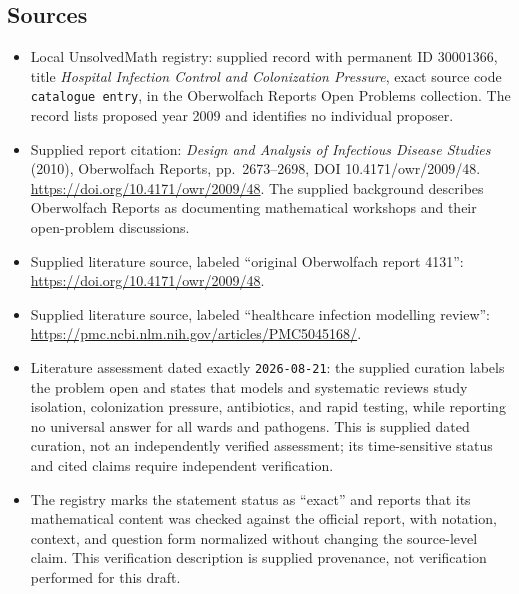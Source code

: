 \documentclass[11pt]{article}
\begin{document}
\subsection{Sources}
\begin{itemize}
\item Local UnsolvedMath registry: supplied record with permanent ID \(30001366\), title \emph{Hospital Infection Control and Colonization Pressure}, exact source code \texttt{catalogue entry}, in the Oberwolfach Reports Open Problems collection. The record lists proposed year 2009 and identifies no individual proposer.
\item Supplied report citation: \emph{Design and Analysis of Infectious Disease Studies} (2010), Oberwolfach Reports, pp.\ 2673--2698, DOI 10.4171/owr/2009/48. \url{https://doi.org/10.4171/owr/2009/48}. The supplied background describes Oberwolfach Reports as documenting mathematical workshops and their open-problem discussions.
\item Supplied literature source, labeled ``original Oberwolfach report 4131'': \url{https://doi.org/10.4171/owr/2009/48}.
\item Supplied literature source, labeled ``healthcare infection modelling review'': \url{https://pmc.ncbi.nlm.nih.gov/articles/PMC5045168/}.
\item Literature assessment dated exactly \texttt{2026-08-21}: the supplied curation labels the problem open and states that models and systematic reviews study isolation, colonization pressure, antibiotics, and rapid testing, while reporting no universal answer for all wards and pathogens. This is supplied dated curation, not an independently verified assessment; its time-sensitive status and cited claims require independent verification.
\item The registry marks the statement status as ``exact'' and reports that its mathematical content was checked against the official report, with notation, context, and question form normalized without changing the source-level claim. This verification description is supplied provenance, not verification performed for this draft.
\end{itemize}
\end{document}
